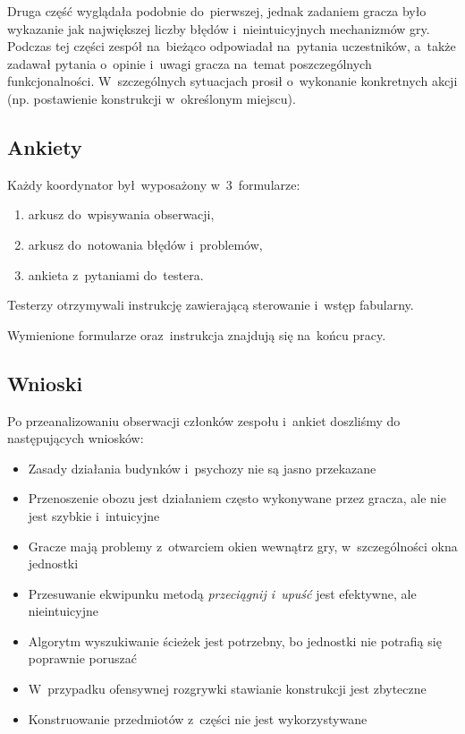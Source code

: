 \documentclass[licencjacka]{pracamgr}
\begin{document}
      Druga część wyglądała podobnie do~pierwszej, jednak zadaniem gracza było wykazanie
      jak największej liczby błędów i~nieintuicyjnych mechanizmów gry.
      Podczas tej części zespół na~bieżąco odpowiadał na~pytania uczestników,
      a~także zadawał pytania o~opinie i~uwagi gracza na~temat poszczególnych funkcjonalności.
      W~szczególnych sytuacjach prosił o~wykonanie konkretnych akcji (np. postawienie konstrukcji w~określonym miejscu).

    \subsection{Ankiety}
      Każdy koordynator był~wyposażony w~3~formularze:
      \begin{enumerate}
	\item arkusz do~wpisywania obserwacji,
	\item arkusz do~notowania błędów i~problemów,
	\item ankieta z~pytaniami do~testera.
      \end{enumerate}
      Testerzy otrzymywali instrukcję zawierającą sterowanie i~wstęp fabularny.

      \noindent
      Wymienione formularze oraz~instrukcja znajdują się na~końcu pracy.

    \subsection{Wnioski}
      Po przeanalizowaniu obserwacji członków zespołu i~ankiet doszliśmy do następujących wniosków:
      \begin{itemize}
	\item Zasady działania budynków i~psychozy nie są jasno przekazane
	\item Przenoszenie obozu jest działaniem często wykonywane przez gracza, ale nie jest szybkie i~intuicyjne
	\item Gracze mają problemy z~otwarciem okien wewnątrz gry, w~szczególności okna jednostki
	\item Przesuwanie ekwipunku metodą \emph{przeciągnij i~upuść} jest efektywne, ale nieintuicyjne
	\item Algorytm wyszukiwanie ścieżek jest potrzebny, bo jednostki nie potrafią się poprawnie poruszać
	\item W~przypadku ofensywnej rozgrywki stawianie konstrukcji jest zbyteczne
	\item Konstruowanie przedmiotów z~części nie jest wykorzystywane
      \end{itemize}
\end{document}
